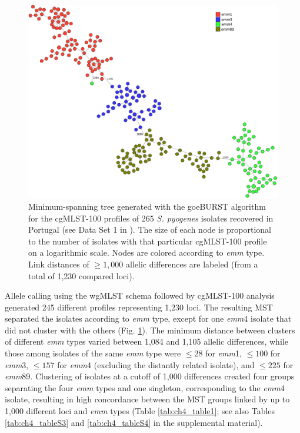 \newpage
\begin{figure}[h!]
    \centering
    \includegraphics[width=\textwidth]{figures/chapter 4/Figure1.pdf}
    \caption{Minimum-spanning tree generated with the goeBURST algorithm for the cgMLST-100 proﬁles of 265 \textit{S. pyogenes} isolates recovered in Portugal (see Data Set 1 in \cite{friaes_supplemental_2023}). The size of each node is proportional to the number of isolates with that particular cgMLST-100 proﬁle on a logarithmic scale. Nodes are colored according to \textit{emm} type. Link distances of $\geq1,000$ allelic differences are labeled (from a total of 1,230 compared loci).}
    \label{fig:chap4_figure1}
\end{figure}

Allele calling using the \ac{wgMLST} schema followed by cgMLST-100 analysis generated 245 different proﬁles representing 1,230 loci. The resulting \ac{MST} separated the isolates according to \textit{emm} type, except for one \textit{emm}4 isolate that did not cluster with the others (Fig. \ref{fig:chap4_figure1}). The minimum distance between clusters of different \textit{emm} types varied between 1,084 and 1,105 allelic differences, while those among isolates of the same \textit{emm} type were $\leq28$ for \textit{emm}1, $\leq100$ for \textit{emm}3, $\leq157$ for \textit{emm}4 (excluding the distantly related isolate), and $\leq225$ for \textit{emm}89. Clustering of isolates at a cutoff of 1,000 differences created four groups separating the four \textit{emm} types and one singleton, corresponding to the \textit{emm}4 isolate, resulting in high concordance between the \ac{MST} groups linked by up to 1,000 different loci and \textit{emm} types (Table \ref{tab:ch4_table1}; see also Tables \ref{tab:ch4_tableS3} and \ref{tab:ch4_tableS4} in the supplemental material).

